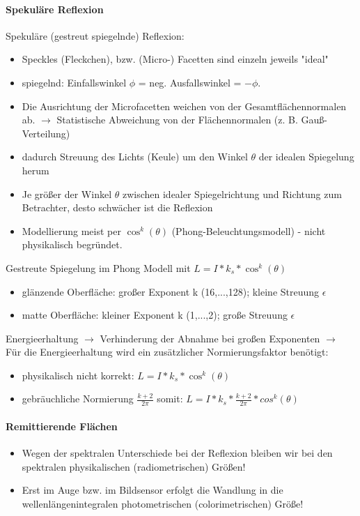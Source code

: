 \documentclass[10pt,landscape]{article}
\begin{document}
\begin{multicols}{3}
\paragraph{Spekuläre Reflexion}
Spekuläre (gestreut spiegelnde) Reflexion:
\begin{itemize}
  \item Speckles (Fleckchen), bzw. (Micro-) Facetten sind einzeln jeweils "ideal"
  \item spiegelnd: Einfallswinkel $\phi$ = neg. Ausfallswinkel = $-\phi$.
  \item Die Ausrichtung der Microfacetten weichen von der Gesamtflächennormalen ab. $\rightarrow$ Statistische Abweichung von der Flächennormalen (z. B. Gauß-Verteilung)
  \item dadurch Streuung des Lichts (Keule) um den Winkel $\theta$ der idealen Spiegelung herum
  \item Je größer der Winkel $\theta$ zwischen idealer Spiegelrichtung und Richtung zum Betrachter, desto schwächer ist die Reflexion
  \item Modellierung meist per $\cos^k(\theta)$ (Phong-Beleuchtungsmodell) - nicht physikalisch begründet.
\end{itemize}


Gestreute Spiegelung im Phong Modell mit $L=I*k_s*\cos^k(\theta)$
\begin{itemize}
  \item glänzende Oberfläche: großer Exponent k (16,...,128); kleine Streuung $\epsilon$
  \item matte Oberfläche: kleiner Exponent k (1,...,2); große Streuung $\epsilon$
\end{itemize}

Energieerhaltung $\rightarrow$ Verhinderung der Abnahme bei großen Exponenten $\rightarrow$ Für die Energieerhaltung wird ein zusätzlicher Normierungsfaktor benötigt:
\begin{itemize}
  \item physikalisch nicht korrekt:  $L=I*k_s*\cos^k(\theta)$
  \item gebräuchliche Normierung $\frac{k+2}{2\pi}$ somit: $L=I*k_s*\frac{k+2}{2\pi}*cos^k(\theta)$
\end{itemize}

\paragraph{Remittierende Flächen}
\begin{itemize}
  \item Wegen der spektralen Unterschiede bei der Reflexion bleiben wir bei den spektralen physikalischen (radiometrischen) Größen!
  \item Erst im Auge bzw. im Bildsensor erfolgt die Wandlung in die wellenlängenintegralen photometrischen (colorimetrischen) Größe!
\end{itemize}


\end{multicols}
\end{document}
